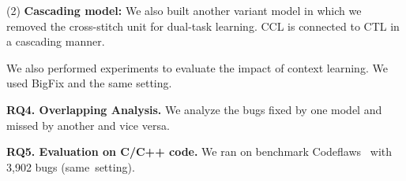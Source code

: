 
(2) \textbf{Cascading model:} We also built another variant model in
which we removed the cross-stitch unit for dual-task learning. CCL is
connected to CTL in a cascading manner.

We also performed experiments to evaluate the impact of context
learning. We used BigFix and the same setting.







\vspace{2pt} {\bf RQ4. Overlapping Analysis.} We analyze the bugs
fixed by one model and missed by another and vice versa.

{\bf RQ5. Evaluation on C/C++ code.} We ran {\tool} on benchmark
Codeflaws~\cite{tan2017codeflaws} with 3,902 bugs (same~setting).
